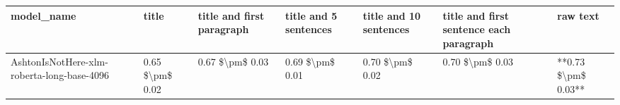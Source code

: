 \begin{tabular}{lllllll}
\toprule
                                model\_name &           title & title and first paragraph & title and 5 sentences & title and 10 sentences & title and first sentence each paragraph &            raw text \\
\midrule
AshtonIsNotHere-xlm-roberta-long-base-4096 & 0.65 \$\textbackslash pm\$ 0.02 &           0.67 \$\textbackslash pm\$ 0.03 &       0.69 \$\textbackslash pm\$ 0.01 &        0.70 \$\textbackslash pm\$ 0.02 &                         0.70 \$\textbackslash pm\$ 0.03 & **0.73 \$\textbackslash pm\$ 0.03** \\
\bottomrule
\end{tabular}
